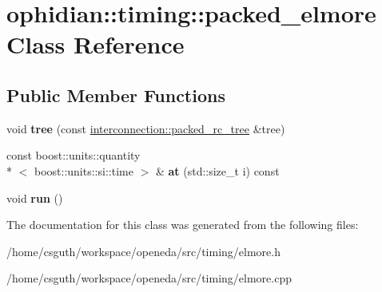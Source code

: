 \hypertarget{classophidian_1_1timing_1_1packed__elmore}{\section{ophidian\-:\-:timing\-:\-:packed\-\_\-elmore Class Reference}
\label{classophidian_1_1timing_1_1packed__elmore}
}
\subsection*{Public Member Functions}
\begin{DoxyCompactItemize}
\item 
\hypertarget{classophidian_1_1timing_1_1packed__elmore_aa285133f1d86f1bee0dfb2ca02310592}{void {\bfseries tree} (const \hyperlink{classophidian_1_1interconnection_1_1packed__rc__tree}{interconnection\-::packed\-\_\-rc\-\_\-tree} \&tree)}\label{classophidian_1_1timing_1_1packed__elmore_aa285133f1d86f1bee0dfb2ca02310592}

\item 
\hypertarget{classophidian_1_1timing_1_1packed__elmore_a77dde9a211cc0c3f5c857f6fae9c317d}{const boost\-::units\-::quantity\\*
$<$ boost\-::units\-::si\-::time $>$ \& {\bfseries at} (std\-::size\-\_\-t i) const }\label{classophidian_1_1timing_1_1packed__elmore_a77dde9a211cc0c3f5c857f6fae9c317d}

\item 
\hypertarget{classophidian_1_1timing_1_1packed__elmore_a1fd2a86c7bb7b3282c183a2f5aea7f31}{void {\bfseries run} ()}\label{classophidian_1_1timing_1_1packed__elmore_a1fd2a86c7bb7b3282c183a2f5aea7f31}

\end{DoxyCompactItemize}


The documentation for this class was generated from the following files\-:\begin{DoxyCompactItemize}
\item 
/home/csguth/workspace/openeda/src/timing/elmore.\-h\item 
/home/csguth/workspace/openeda/src/timing/elmore.\-cpp\end{DoxyCompactItemize}
